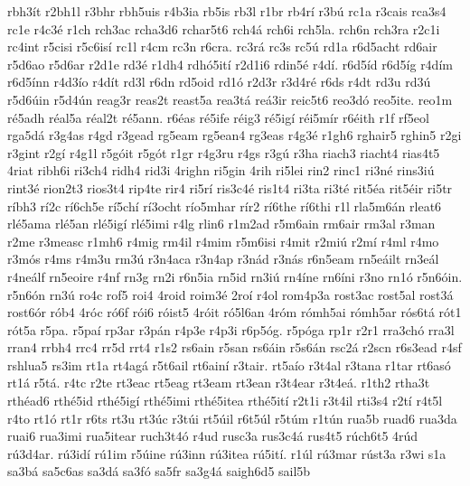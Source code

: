 {rbh3^^edt
r2bh1l
r3bhr
rbh5uis
r4b3ia
rb5is
rb3l
r1br
rb4r^^ed
r3b^^fa
rc1a
r3cais
rca3s4
rc1e
r4c3^^e9
r1ch
rch3ac
rcha3d6
rchar5t6
rch4^^e1
rch6i
rch5la.
rch6n
rch3ra
r2c1i
rc4int
r5cisi
r5c6is^^ed
rc1l
r4cm
rc3n
r6cra.
rc3r^^e1
rc3s
rc5^^fa
rd1a
r6d5acht
rd6air
r5d6ao
r5d6ar
r2d1e
rd3^^e9
r1dh4
rdh^^f35it^^ed
r2d1i6
rdin5^^e9
r4d^^ed.
r6d5^^edd
r6d5^^edg
r4d^^edm
r6d5^^ednn
r4d3^^edo
r4d^^edt
rd3l
r6dn
rd5oid
rd1^^f3
r2d3r
r3d4r^^e9
r6ds
r4dt
rd3u
rd3^^fa
r5d6^^fain
r5d4^^fan
reag3r
reas2t
reast5a
rea3t^^e1
re^^e13ir
reic5t6
reo3d^^f3
reo5ite.
reo1m
r^^e95adh
r^^e9al5a
r^^e9al2t
r^^e95ann.
r6^^e9as
r^^e95ife
r^^e9ig3
r^^e95ig^^ed
r^^e9i5m^^edr
r6^^e9ith
r1f
rf5eol
rga5d^^e1
r3g4as
r4gd
r3gead
rg5eam
rg5ean4
rg3eas
r4g3^^e9
r1gh6
rghair5
rghin5
r2gi
r3gint
r2g^^ed
r4g1l
r5g^^f3it
r5g^^f3t
r1gr
r4g3ru
r4gs
r3g^^fa
r3ha
riach3
riacht4
rias4t5
4riat
ribh6i
ri3ch4
ridh4
rid3i
4righn
ri5gin
4rih
ri5lei
rin2
rinc1
ri3n^^e9
rins3i^^fa
rint3^^e9
rion2t3
rios3t4
rip4te
rir4
ri5r^^ed
ris3c4^^e9
ris1t4
ri3ta
ri3t^^e9
rit5^^e9a
rit5^^e9ir
ri5tr
r^^edbh3
r^^ed2c
r^^ed6ch5e
r^^ed5ch^^ed
r^^ed3ocht
r^^edo5mhar
r^^edr2
r^^ed6the
r^^ed6thi
r1l
rla5m6^^e1n
rleat6
rl^^e95ama
rl^^e95an
rl^^e95ig^^ed
rl^^e95imi
r4lg
rlin6
r1m2ad
r5m6ain
rm6air
rm3al
r3man
r2me
r3measc
r1mh6
r4mig
rm4il
r4mim
r5m6isi
r4mit
r2mi^^fa
r2m^^ed
r4ml
r4mo
r3m^^f3s
r4ms
r4m3u
rm3^^fa
r3n4aca
r3n4ap
r3n^^e1d
r3n^^e1s
r6n5eam
rn5e^^e1ilt
rn3e^^e1l
r4ne^^e1lf
rn5eoire
r4nf
rn3g
rn2i
r6n5ia
rn5id
rn3i^^fa
rn4^^edne
rn6^^edni
r3no
rn1^^f3
r5n6^^f3in.
r5n6^^f3n
rn3^^fa
ro4c
rof5
roi4
4roid
roim3^^e9
2ro^^ed
r4ol
rom4p3a
rost3ac
rost5al
rost3^^e1
rost6^^f3r
r^^f3b4
4r^^f3c
r^^f36f
r^^f3i6
r^^f3ist5
4r^^f3it
r^^f35l6an
4r^^f3m
r^^f3mh5ai
r^^f3mh5ar
r^^f3s6t^^e1
r^^f3t1
r^^f3t5a
r5pa.
r5pa^^ed
rp3ar
r3p^^e1n
r4p3e
r4p3i
r6p5^^f3g.
r5p^^f3ga
rp1r
r2r1
rra3ch^^f3
rra3l
rran4
rrbh4
rrc4
rr5d
rrt4
r1s2
rs6ain
r5san
rs6^^e1in
r5s6^^e1n
rsc2^^e1
r2scn
r6s3ead
r4sf
rshlua5
rs3im
rt1a
rt4ag^^e1
r5t6ail
rt6ain^^ed
r3tair.
rt5a^^edo
r3t4al
r3tana
r1tar
rt6as^^f3
rt1^^e1
r5t^^e1.
r4tc
r2te
rt3eac
rt5eag
rt3eam
rt3ean
r3t4ear
r3t4e^^e1.
r1th2
rtha3t
rth^^e9ad6
rth^^e95id
rth^^e95ig^^ed
rth^^e95imi
rth^^e95itea
rth^^e95it^^ed
r2t1i
r3t4il
rti3s4
r2t^^ed
r4t5l
r4to
rt1^^f3
rt1r
r6ts
rt3u
rt3^^fac
r3t^^fai
rt5^^fail
r6t5^^fal
r5t^^fam
r1t^^fan
rua5b
ruad6
rua3da
ruai6
rua3imi
rua5itear
ruch3t4^^f3
r4ud
rusc3a
rus3c4^^e1
rus4t5
r^^fach6t5
4r^^fad
r^^fa3d4ar.
r^^fa3id^^ed
r^^fa1im
r5^^faine
r^^fa3inn
r^^fa3itea
r^^fa5it^^ed.
r1^^fal
r^^fa3mar
r^^fast3a
r3wi
s1a
sa3b^^e1
sa5c6as
sa3d^^e1
sa3f^^f3
sa5fr
sa3g4^^e1
saigh6d5
sail5b
}
